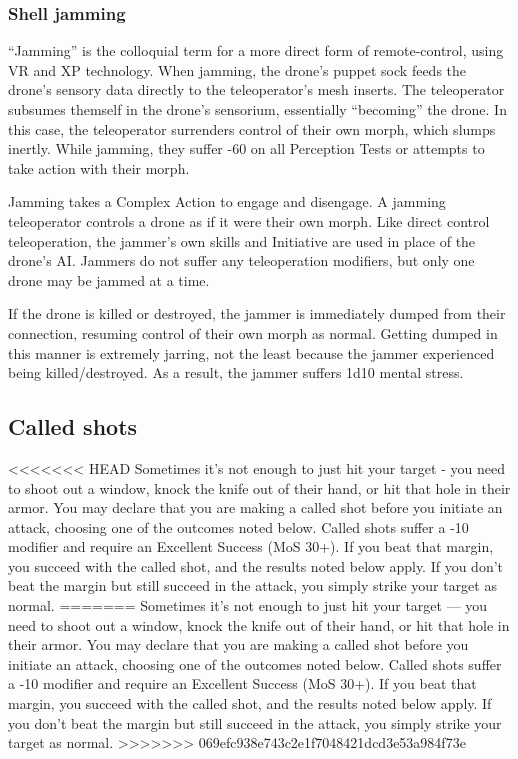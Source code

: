\subsubsection{Shell jamming}

``Jamming'' is the colloquial term for a more direct form of remote-control, using VR and XP technology. When jamming, the drone’s puppet sock feeds the drone’s sensory data directly to the teleoperator’s mesh inserts. The teleoperator subsumes themself in the drone’s sensorium, essentially ``becoming'' the drone. In this case, the teleoperator surrenders control of their own morph, which slumps inertly. While jamming, they suffer -60 on all Perception Tests or attempts to take action with their morph.

Jamming takes a Complex Action to engage and disengage. A jamming teleoperator controls a drone as if it were their own morph. Like direct control teleoperation, the jammer’s own skills and Initiative are used in place of the drone’s AI. Jammers do not suffer any teleoperation modifiers, but only one drone may be jammed at a time.

If the drone is killed or destroyed, the jammer is immediately dumped from their connection, resuming control of their own morph as normal. Getting dumped in this manner is extremely jarring, not the least because the jammer experienced being killed/destroyed. As a result, the jammer suffers 1d10 mental stress.


\subsection{Called shots}
\label{sec:called-shots}

<<<<<<< HEAD
Sometimes it’s not enough to just hit your target - you need to shoot out a window, knock the knife out of their hand, or hit that hole in their armor. You may declare that you are making a called shot before you initiate an attack, choosing one of the outcomes noted below. Called shots suffer a -10 modifier and require an Excellent Success (MoS 30+). If you beat that margin, you succeed with the called shot, and the results noted below apply. If you don’t beat the margin but still succeed in the attack, you simply strike your target as normal.
=======
Sometimes it’s not enough to just hit your target --- you need to shoot out a window, knock the knife out of their hand, or hit that hole in their armor. You may declare that you are making a called shot before you initiate an attack, choosing one of the outcomes noted below. Called shots suffer a -10 modifier and require an Excellent Success (MoS 30+). If you beat that margin, you succeed with the called shot, and the results noted below apply. If you don’t beat the margin but still succeed in the attack, you simply strike your target as normal.
>>>>>>> 069efc938e743c2e1f7048421dcd3e53a984f73e

